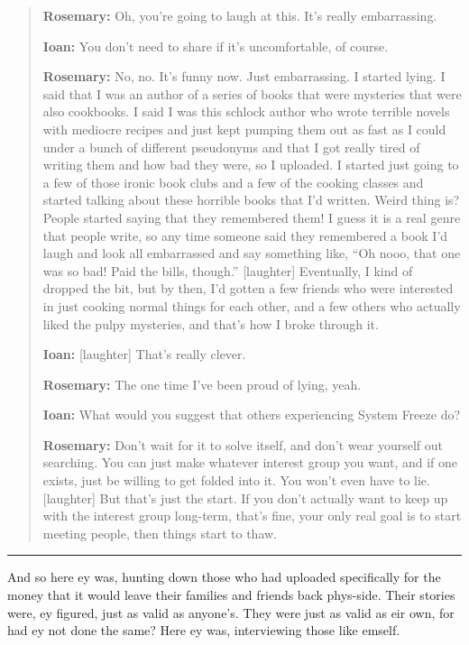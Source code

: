 \begin{quote}
\textbf{Rosemary:} Oh, you're going to laugh at this. It's really embarrassing.

\textbf{Ioan:} You don't need to share if it's uncomfortable, of course.

\textbf{Rosemary:} No, no. It's funny now. Just embarrassing. I started lying. I said that I was an author of a series of books that were mysteries that were also cookbooks. I said I was this schlock author who wrote terrible novels with mediocre recipes and just kept pumping them out as fast as I could under a bunch of different pseudonyms and that I got really tired of writing them and how bad they were, so I uploaded. I started just going to a few of those ironic book clubs and a few of the cooking classes and started talking about these horrible books that I'd written. Weird thing is? People started saying that they remembered them! I guess it is a real genre that people write, so any time someone said they remembered a book I'd laugh and look all embarrassed and say something like, ``Oh nooo, that one was so bad! Paid the bills, though.'' {[}laughter{]} Eventually, I kind of dropped the bit, but by then, I'd gotten a few friends who were interested in just cooking normal things for each other, and a few others who actually liked the pulpy mysteries, and that's how I broke through it.

\textbf{Ioan:} {[}laughter{]} That's really clever.

\textbf{Rosemary:} The one time I've been proud of lying, yeah.

\textbf{Ioan:} What would you suggest that others experiencing System Freeze do?

\textbf{Rosemary:} Don't wait for it to solve itself, and don't wear yourself out searching. You can just make whatever interest group you want, and if one exists, just be willing to get folded into it. You won't even have to lie. {[}laughter{]} But that's just the start. If you don't actually want to keep up with the interest group long-term, that's fine, your only real goal is to start meeting people, then things start to thaw.
\end{quote}

\begin{center}\rule{0.5\linewidth}{0.5pt}\end{center}

\noindent And so here ey was, hunting down those who had uploaded specifically for the money that it would leave their families and friends back phys-side. Their stories were, ey figured, just as valid as anyone's. They were just as valid as eir own, for had ey not done the same? Here ey was, interviewing those like emself.

